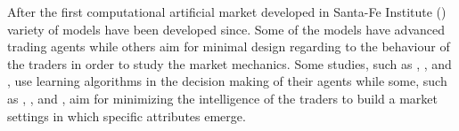 After the first computational artificial market developed in Santa-Fe Institute
(\citet{SantaFe94}) variety of models have been developed since. Some of the
models have advanced trading agents while others aim for minimal design 
regarding to the behaviour of the traders in order to study the market
mechanics. Some studies, such as \citet{GOYKHMAN20181729}, \citet{IZUMI200535},
\citet{Reinforcement09} and \citet{YEH20102089}, use learning algorithms in the decision making of 
their agents while some, such as \citet{God93}, \citet{Jam96}, \citet{Genoa01} and \citet{Raberto05}, 
aim for minimizing the intelligence of the traders to build a market settings in which
specific attributes emerge. %



